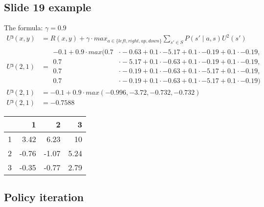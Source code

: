 \documentclass[colorlinks=true,linkcolor=blue]{article}
\begin{document}
\subsection{Slide 19 example}
\label{sec-5-1}

The formula: $\gamma = 0.9$
\begin{align*}
U³(x,y) &= R(x,y) + \gamma \cdot max_{a \in \{left,right,up,down\} } \sum_{s'\in S} P(s' \mid a,s) U^2(s')\\
U³(2,1) &=
\begin{aligned}
  -0.1 + 0.9 \cdot max(0.7 &\cdot -0.63 + 0.1 \cdot -5.17 + 0.1 \cdot -0.19 + 0.1 \cdot -0.19,\\ 
  0.7 &\cdot -5.17 + 0.1 \cdot -0.63 + 0.1 \cdot -0.19 + 0.1 \cdot -0.19,\\ 
  0.7 &\cdot -0.19 + 0.1 \cdot -0.63 + 0.1 \cdot -5.17 + 0.1 \cdot -0.19,\\ 
  0.7 &\cdot -0.19 + 0.1 \cdot -0.63 + 0.1 \cdot -5.17 + 0.1 \cdot -0.19)
\end{aligned}
\\
U³(2,1) &= -0.1 + 0.9 \cdot max(-0.996,-3.72,-0.732,-0.732)\\
U³(2,1) &= -0.7588
\end{align*}
\begin{center}
\begin{tabular}{r|r|r|r|}
 & 1 & 2 & 3\\
\hline
1 & 3.42 & 6.23 & 10\\
\hline
2 & -0.76 & -1.07 & 5.24\\
\hline
3 & -0.35 & -0.77 & 2.79\\
\hline
\end{tabular}
\end{center}

\subsection{Policy iteration}
\label{sec-5-2}
\end{document}
